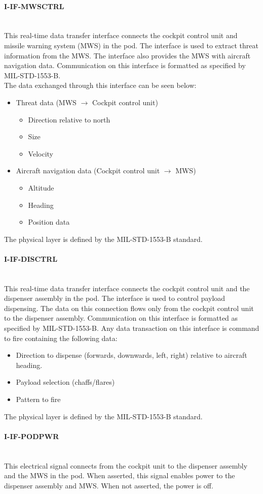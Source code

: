 \paragraph{I-IF-MWSCTRL}\mbox{}\\
This real-time data transfer interface connects the cockpit control unit and missile warning system (MWS) in the pod. The interface is used to extract threat information from the MWS. The interface also provides the MWS with aircraft navigation data.
Communication on this interface is formatted as specified by MIL-STD-1553-B.
\\
The data exchanged through this interface can be seen below:
\begin{itemize}
\item Threat data (MWS $\rightarrow$ Cockpit control unit)
	\begin{itemize}
	\item Direction relative to north
	\item Size
	\item Velocity
	\end{itemize}
\item Aircraft navigation data (Cockpit control unit $\rightarrow$ MWS)
	\begin{itemize}
	\item Altitude
	\item Heading
	\item Position data
	\end{itemize}
\end{itemize}
The physical layer is defined by the MIL-STD-1553-B standard.

\paragraph{I-IF-DISCTRL}\mbox{}\\
This real-time data transfer interface connects the cockpit control unit and the dispenser assembly in the pod. The interface is used to control payload dispensing.
The data on this connection flows only from the cockpit control unit to the dispenser assembly. Communication on this interface is formatted as specified by MIL-STD-1553-B. Any data transaction on this interface is command to fire containing the following data:
\begin{itemize}
\item Direction to dispense (forwards, downwards, left, right) relative to aircraft heading. 
\item Payload selection (chaffs/flares)
\item Pattern to fire
\end{itemize}
The physical layer is defined by the MIL-STD-1553-B standard.

\paragraph{I-IF-PODPWR}\mbox{}\\
This electrical signal connects from the cockpit unit to the dispenser assembly and the MWS in the pod. When asserted, this signal enables power to the dispenser assembly and MWS. When not asserted, the power is off.